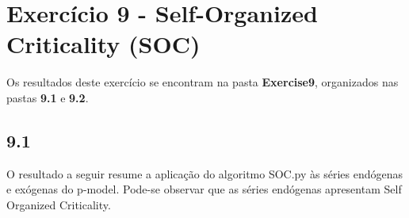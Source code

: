 
\section*{\large Exercício 9 - Self-Organized Criticality (SOC)}
%

Os resultados deste exercício se encontram na pasta \textbf{Exercise9}, organizados nas pastas \textbf{9.1} e \textbf{9.2}.

\subsection*{9.1}
%

O resultado a seguir resume a aplicação do algoritmo SOC.py às séries endógenas e exógenas do p-model. Pode-se observar que as séries endógenas apresentam Self Organized Criticality.

\begin{figure}[ht!]
	\vspace{0mm}	%
	\begin{center}
	\end{center}
	\vspace{-2mm}	%
	\label{ex9_fig1}
\end{figure}

